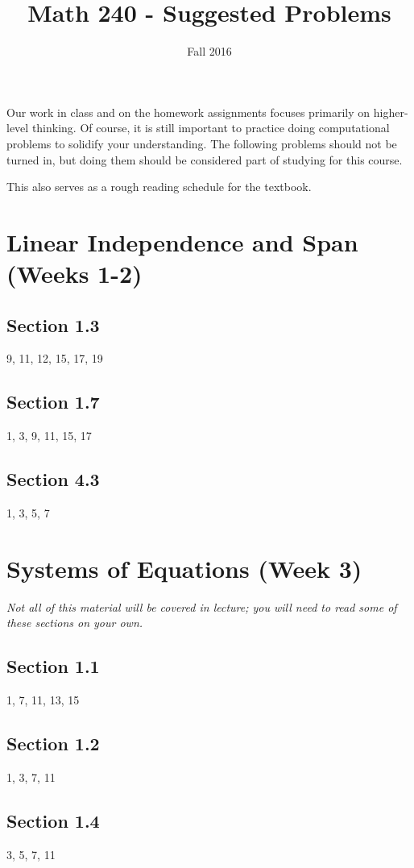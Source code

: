 \documentclass{amsart}
\begin{document}
	\title{Math 240 - Suggested Problems}
	\author{Fall 2016}
	\maketitle
	

Our work in class and on the homework assignments focuses primarily on
higher-level thinking.  Of course, it is still important to practice doing
computational problems to solidify your understanding.  The following
problems should not be turned in, but doing them should be considered part
of studying for this course.

\bigskip

This also serves as a rough reading schedule for the textbook.


\section{Linear Independence and Span (Weeks 1-2)}

\subsection*{Section 1.3} 9, 11, 12, 15, 17, 19
\subsection*{Section 1.7} 1, 3, 9, 11, 15, 17
\subsection*{Section 4.3} 1, 3, 5, 7


\section{Systems of Equations (Week 3)}

\textit{Not all of this material will be covered in lecture; you will need to read some of these sections on your own.}

\subsection*{Section 1.1} 1, 7, 11, 13, 15
\subsection*{Section 1.2} 1, 3, 7, 11
\subsection*{Section 1.4} 3, 5, 7, 11
\end{document}
